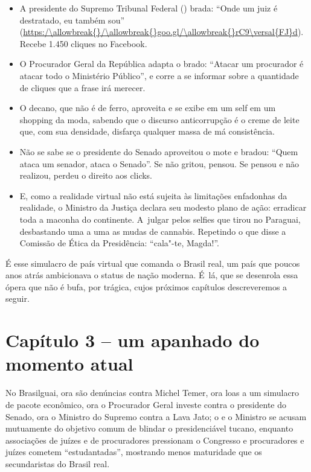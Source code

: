 \begin{itemize}
\itemsep1pt\parskip0pt
\item
  A presidente do Supremo Tribunal Federal () brada: ``Onde um juiz é
  destratado, eu também sou'' (\url{https:/\allowbreak{}/\allowbreak{}goo.gl/\allowbreak{}rC9\versal{FJ}d}). Recebe
  1.450 cliques no Facebook.
\item
  O Procurador Geral da República adapta o brado: ``Atacar um procurador
  é atacar todo o Ministério Público'', e corre a se informar sobre a
  quantidade de cliques que a frase irá merecer.
\item
  O decano, que não é de ferro, aproveita e se exibe em um self em um
  shopping da moda, sabendo que o discurso anticorrupção é o creme de
  leite que, com sua densidade, disfarça qualquer massa de má
  consistência.
\item
  Não se sabe se o presidente do Senado aproveitou o mote e bradou:
  ``Quem ataca um senador, ataca o Senado''. Se não gritou, pensou. Se
  pensou e não realizou, perdeu o direito aos clicks.
\item
  E, como a realidade virtual não está sujeita às limitações enfadonhas
  da realidade, o Ministro da Justiça declara seu modesto plano de ação:
  erradicar toda a maconha do continente. A~julgar pelos selfies que
  tirou no Paraguai, desbastando uma a uma as mudas de cannabis.
  Repetindo o que disse a Comissão de Ética da Presidência: ``cala"-te,
  Magda!''.
\end{itemize}

É esse simulacro de país virtual que comanda o Brasil real, um país que
poucos anos atrás ambicionava o status de nação moderna. É~lá, que se
desenrola essa ópera que não é bufa, por trágica, cujos próximos
capítulos descreveremos a seguir.

\section{Capítulo 3 -- um apanhado do momento atual}

No Brasilguai, ora são denúncias contra Michel Temer, ora loas a um
simulacro de pacote econômico, ora o Procurador Geral investe contra o
presidente do Senado, ora o Ministro do Supremo contra a Lava Jato; o
 e o Ministro se acusam mutuamente do objetivo comum de blindar o
presidenciável tucano, enquanto associações de juízes e de procuradores
pressionam o Congresso e procuradores e juízes cometem ``estudantadas'',
mostrando menos maturidade que os secundaristas do Brasil real.

